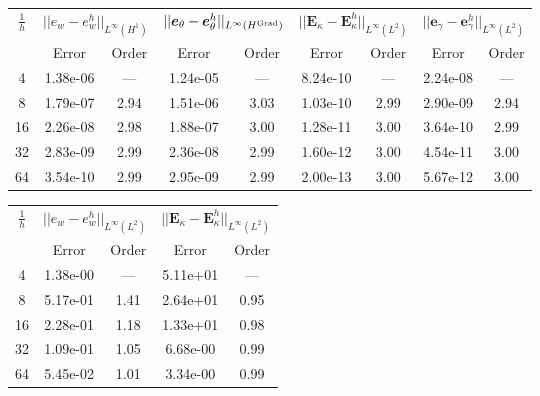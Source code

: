 \begin{table}[hp]
	\centering
	\begin{tabular}{ccccccccc}
		\hline 
		\multirow{2}{*}{$\frac{1}{h}$} & \multicolumn{2}{c}{$||e_w - e_w^h||_{L^{\infty}(H^1)}$}    & \multicolumn{2}{c}{$||\bm{e}_\theta - \bm{e}_\theta^h||_{L^{\infty}(H^{\operatorname*{Grad}})}$} & \multicolumn{2}{c}{$||\bm{E}_\kappa - \bm{E}_\kappa^h||_{L^{\infty}(L^2)}$} & \multicolumn{2}{c}{$||\bm{e}_\gamma - \bm{e}_\gamma^ h||_{L^{\infty}(L^2)}$}   \\
		& Error & Order  & Error & Order  & Error & Order  & Error & Order   \\ 
		\hline 
		4  & 1.38e-06 & ---  & 1.24e-05 & ---  & 8.24e-10 & ---  & 2.24e-08 & --- \\ 
		8  & 1.79e-07 & 2.94 & 1.51e-06 & 3.03 & 1.03e-10 & 2.99 & 2.90e-09 & 2.94\\ 
		16 & 2.26e-08 & 2.98 & 1.88e-07 & 3.00 & 1.28e-11 & 3.00 & 3.64e-10 & 2.99\\ 
		32 & 2.83e-09 & 2.99 & 2.36e-08 & 2.99 & 1.60e-12 & 3.00 & 4.54e-11 & 3.00\\ 
		64 & 3.54e-10 & 2.99 & 2.95e-09 & 2.99 & 2.00e-13 & 3.00 & 5.67e-12 & 3.00\\ 
		\hline 
	\end{tabular} 
	\captionsetup{width=0.95\linewidth}
	\vspace{1mm}
	\label{tab:resminCGDG_k3}
\end{table}


\begin{table}[hp]
	\centering
	\begin{tabular}{ccccc}
		\hline 
		\multirow{2}{*}{$\frac{1}{h}$} & \multicolumn{2}{c}{$||e_w - e_w^h||_{L^{\infty}(L^2)}$}  & \multicolumn{2}{c}{$||\bm{E}_\kappa - \bm{E}_\kappa^h||_{L^{\infty}(L^2)}$}   \\ 
		& Error & Order  & Error & Order  \\
		\hline 
		4  & 1.38e-00 & ---  & 5.11e+01 & ---  \\ 
		8  & 5.17e-01 & 1.41 & 2.64e+01 & 0.95 \\ 
		16 & 2.28e-01 & 1.18 & 1.33e+01 & 0.98 \\ 
		32 & 1.09e-01 & 1.05 & 6.68e-00 & 0.99 \\ 
		64 & 5.45e-02 & 1.01 & 3.34e-00 & 0.99 \\ 
		\hline 
	\end{tabular} 
	\captionsetup{width=0.95\linewidth}
	\vspace{1mm}
	\label{tab:reskirHHJ_SSSS_k1}
\end{table}

